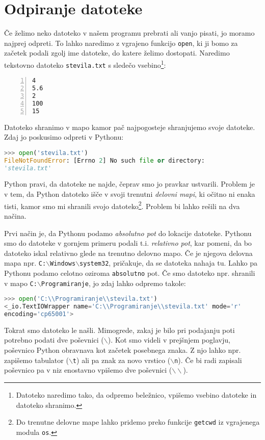 \section{Odpiranje datoteke}

Če želimo neko datoteko v našem programu prebrati ali vanjo pisati, jo moramo najprej odpreti. To lahko naredimo z vgrajeno funkcijo \texttt{open}, ki ji bomo za začetek podali zgolj ime datoteke, do katere želimo dostopati. Naredimo tekstovno datoteko \texttt{stevila.txt} s sledečo vsebino\footnote{Datoteko naredimo tako, da odpremo beležnico, vpišemo vsebino datoteke in datoteko shranimo.}:
\begin{lstlisting}[showstringspaces=false,numbers=left]
4
5.6
2
100
15
\end{lstlisting}
Datoteko shranimo v mapo kamor pač najpogosteje shranjujemo svoje datoteke. Zdaj jo poskusimo odpreti v Pythonu:
\begin{lstlisting}[language=Python, showstringspaces=false]
>>> open('stevila.txt')
FileNotFoundError: [Errno 2] No such file or directory: 
'stevila.txt'
\end{lstlisting}
Python pravi, da datoteke ne najde, čeprav smo jo pravkar ustvarili. Problem je v tem, da Python datoteko išče v svoji trenutni \emph{delovni mapi}, ki očitno ni enaka tisti, kamor smo mi shranili svojo datoteko\footnote{Do trenutne delovne mape lahko pridemo preko funkcije \texttt{getcwd} iz vgrajenega modula \texttt{os}.}. Problem bi lahko rešili na dva načina.

Prvi način je, da Pythonu podamo \emph{absolutno pot} do lokacije datoteke. Pythonu smo do datoteke v gornjem primeru podali t.i. \emph{relativno pot}, kar pomeni, da bo datoteko iskal relativno glede na trenutno delovno mapo. Če je njegova delovna mapa npr. \texttt{C:$\backslash$Windows$\backslash$system32}, pričakuje, da se datoteka nahaja tu. Lahko pa Pythonu podamo celotno oziroma \texttt{absolutno} pot. Če smo datoteko npr. shranili v mapo \texttt{C:$\backslash$Programiranje}, jo zdaj lahko odpremo takole:
\begin{lstlisting}[language=Python, showstringspaces=false]
>>> open('C:\\Programiranje\\stevila.txt')
<_io.TextIOWrapper name='C:\\Programiranje\\stevila.txt' mode='r'
encoding='cp65001'>
\end{lstlisting}
Tokrat smo datoteko le našli. Mimogrede, zakaj je bilo pri podajanju poti potrebno podati dve poševnici (\texttt{$\backslash$}). Kot smo videli v prejšnjem poglavju, poševnico Python obravnava kot začetek posebnega znaka. Z njo lahko npr. zapišemo tabulator (\texttt{$\backslash$t}) ali pa znak za novo vrstico (\texttt{$\backslash$n}). Če bi radi zapisali poševnico pa v niz enostavno vpišemo dve poševnici (\texttt{$\backslash\backslash$}).


